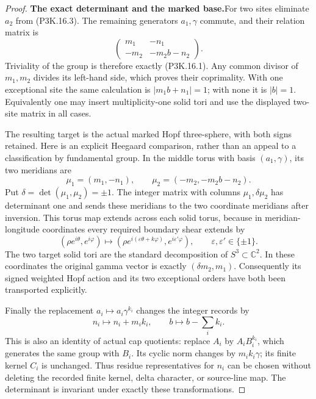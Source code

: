 \begin{proof}
\par\medskip\noindent\textbf{The exact determinant and the marked base.}\enspace For two
sites eliminate \(a_2\) from (P3K.16.3).  The remaining
generators \(a_1,\gamma\) commute, and their relation matrix is
\[
 \begin{pmatrix}
      m_1&-n_1\\
      -m_2&-m_2b-n_2
 \end{pmatrix}.
                                                        \tag{P3K.16.4}
\]
Triviality of the group is therefore exactly (P3K.16.1).
Any common divisor of \(m_1,m_2\) divides its left-hand
side, which proves their coprimality.  With one exceptional
site the same calculation is \(|m_1b+n_1|=1\); with none
it is \(|b|=1\).  Equivalently one may insert multiplicity-one
solid tori and use the displayed two-site matrix in all cases.

The resulting target is the actual marked Hopf three-sphere,
with both signs retained.  Here is an explicit Heegaard
comparison, rather than an appeal to a classification by
fundamental group.  In the middle torus with basis
\((a_1,\gamma)\), its two meridians are
\[
 \mu_1=(m_1,-n_1),\qquad
 \mu_2=(-m_2,-m_2b-n_2).
\]
Put \(\delta=\det(\mu_1,\mu_2)=\pm1\).
The integer matrix with columns \(\mu_1,\delta\mu_2\)
has determinant one and sends these meridians to the two
coordinate meridians after inversion.  This torus map
extends across each solid torus, because in meridian-longitude
coordinates every required boundary shear extends by
\[
 (\rho e^{i\theta},e^{i\varphi})\longmapsto
 (\rho e^{i(\varepsilon\theta+k\varphi)},
                         e^{i\varepsilon'\varphi}),
 \qquad \varepsilon,\varepsilon'\in\{\pm1\}.
\]
The two target solid tori are the standard decomposition of
\(S^3\subset\mathbb C^2\).  In these coordinates the
original gamma vector is exactly \((\delta m_2,m_1)\).
Consequently its signed weighted Hopf action and its two
exceptional orders have both been transported explicitly.

Finally the replacement \(a_i\mapsto a_i\gamma^{k_i}\)
changes the integer records by
\[
         n_i\mapsto n_i+m_i k_i,\qquad
         b\mapsto b-\sum_i k_i.
\]
This is also an identity of actual cap quotients: replace
\(A_i\) by \(A_iB_i^{k_i}\), which generates the same
group with \(B_i\).  Its cyclic norm changes by
\(m_i k_i\gamma\); its finite kernel \(C_i\) is unchanged.
Thus residue representatives for \(n_i\) can be chosen
without deleting the recorded finite kernel, delta character,
or source-line map.  The determinant is invariant under
exactly these transformations.
\end{proof}

